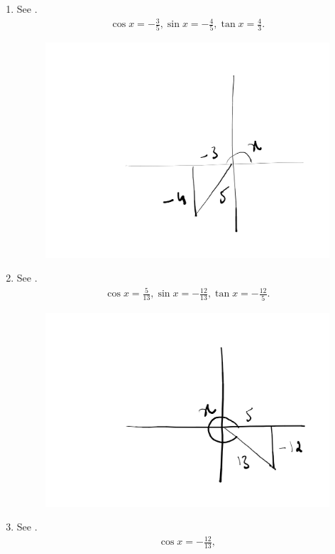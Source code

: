 \begin{enumerate}[label=\thesubsection.\arabic*,ref=\thesubsection.\theenumi,itemsep=1ex]
\begin{enumerate}
\begin{figure}[H]
\begin{center}
	\end{center}
	\caption{}
	\label{fig:ncert-id-5}	
\end{figure}
	\item 
	See .
\begin{align}
	\cos x = -\frac{3}{5},
	\sin x = -\frac{4}{5},
	\tan x = \frac{4}{3}.
\end{align}
\begin{figure}[H]
	\begin{center}
		{\includegraphics[width=0.6\columnwidth]{figs/ncert/id/6.png}}
	\end{center}
	\caption{}
	\label{fig:ncert-id-6}	
\end{figure}
	\item 
	See .	
\begin{align}
	\cos x = \frac{5}{13},
	\sin x = -\frac{12}{13},
	\tan x = -\frac{12}{5}.
\end{align}
\begin{figure}[H]
	\begin{center}
		{\includegraphics[width=0.6\columnwidth]{figs/ncert/id/7.png}}
	\end{center}
	\caption{}
	\label{fig:ncert-id-7}	
\end{figure}
	\item 
	See .	
\begin{align}
	\cos x = -\frac{12}{13},

\end{align}
\end{enumerate}
\end{enumerate}
